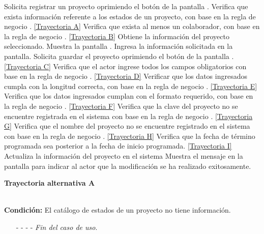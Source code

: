 	\begin{UCtrayectoria}
		\UCpaso[\UCactor] Solicita registrar un proyecto oprimiendo el botón \editar de la pantalla .
		\UCpaso[\UCsist] Verifica que exista información referente a los estados de un proyecto, con base en la regla de negocio . \hyperlink{CU2-2:TAA}{[Trayectoria A]}
		\UCpaso[\UCsist] Verifica que exista al menos un colaborador, con base en la regla de negocio . \hyperlink{CU2-2:TAB}{[Trayectoria B]}
		\UCpaso[\UCsist] Obtiene la información del proyecto seleccionado.
		\UCpaso[\UCsist] Muestra la pantalla .
		\UCpaso[\UCactor] Ingresa la información solicitada en la pantalla. \label{CU2.2-P5}
		\UCpaso[\UCactor] Solicita guardar el proyecto oprimiendo el botón  de la pantalla . \hyperlink{CU2-2:TAC}{[Trayectoria C]}
		\UCpaso[\UCsist] Verifica que el actor ingrese todos los campos obligatorios con base en la regla de negocio . \hyperlink{CU2-2:TAD}{[Trayectoria D]}
		\UCpaso[\UCsist] Verificar que los datos ingresados cumpla con la longitud correcta, con base en la regla de negocio . \hyperlink{CU2-2:TAE}{[Trayectoria E]}
		\UCpaso[\UCsist] Verifica que los datos ingresados cumplan con el formato requerido, con base en la regla de negocio . \hyperlink{CU2-2:TAF}{[Trayectoria F]}
		\UCpaso[\UCsist] Verifica que la clave del proyecto no se encuentre registrada en el sistema con base en la regla de negocio . \hyperlink{CU2-2:TAG}{[Trayectoria G]}
		\UCpaso[\UCsist] Verifica que el nombre del proyecto no se encuentre registrado en el sistema con base en la regla de negocio . \hyperlink{CU2-2:TAH}{[Trayectoria H]}
		\UCpaso[\UCsist] Verifica que la fecha de término programada sea posterior a la fecha de inicio programada. \hyperlink{CU2-2:TAI}{[Trayectoria I]}
		\UCpaso[\UCsist] Actualiza la información del proyecto en el sistema
		\UCpaso[\UCsist] Muestra el mensaje  en la pantalla  para indicar al actor que la modificación se ha realizado exitosamente.
	\end{UCtrayectoria}		
	\hypertarget{CU2-2:TAA}{\textbf{Trayectoria alternativa A}}\\
	\noindent \textbf{Condición:} El catálogo de estados de un proyecto no tiene información.
	\begin{enumerate}
		\UCpaso[\UCsist] Muestra el mensaje  en la pantalla  para indicar que no es posible realizar la operación debido a la falta de información necesaria para el sistema.
		\item[- -] - - {\em {Fin del caso de uso}}.%
	\end{enumerate}
	
